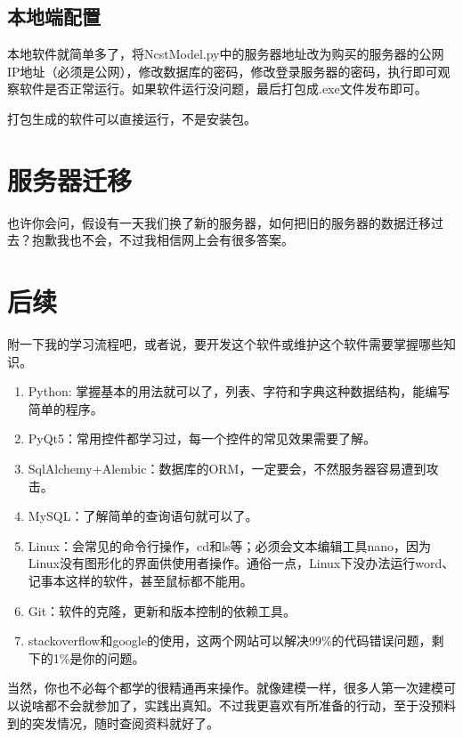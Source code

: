 \documentclass[lang=cn,hazy,normal,blue,12pt]{elegantnote}
\begin{document}
\subsection{本地端配置}

本地软件就简单多了，将NcstModel.py中的服务器地址改为购买的服务器的公网IP地址（必须是公网），修改数据库的密码，修改登录服务器的密码，执行即可观察软件是否正常运行。如果软件运行没问题，最后打包成.exe文件发布即可。

\begin{note}
打包生成的软件可以直接运行，不是安装包。
\end{note}

\section{服务器迁移}

也许你会问，假设有一天我们换了新的服务器，如何把旧的服务器的数据迁移过去？抱歉我也不会，不过我相信网上会有很多答案。

\section{后续}

附一下我的学习流程吧，或者说，要开发这个软件或维护这个软件需要掌握哪些知识。

\begin{enumerate}
    \item Python: 掌握基本的用法就可以了，列表、字符和字典这种数据结构，能编写简单的程序。
    \item PyQt5：常用控件都学习过，每一个控件的常见效果需要了解。
    \item SqlAlchemy+Alembic：数据库的ORM，一定要会，不然服务器容易遭到攻击。
    \item MySQL：了解简单的查询语句就可以了。
    \item Linux：会常见的命令行操作，cd和ls等；必须会文本编辑工具nano，因为Linux没有图形化的界面供使用者操作。通俗一点，Linux下没办法运行word、记事本这样的软件，甚至鼠标都不能用。
    \item Git：软件的克隆，更新和版本控制的依赖工具。
    \item stackoverflow和google的使用，这两个网站可以解决99\%的代码错误问题，剩下的1\%是你的问题。
\end{enumerate}

当然，你也不必每个都学的很精通再来操作。就像建模一样，很多人第一次建模可以说啥都不会就参加了，实践出真知。不过我更喜欢有所准备的行动，至于没预料到的突发情况，随时查阅资料就好了。
\end{document}
